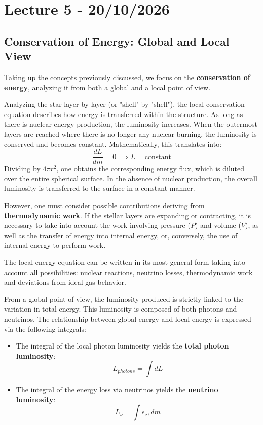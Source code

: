 \chapter{Lecture 5 - 20/10/2026}

\section{Conservation of Energy: Global and Local View}

Taking up the concepts previously discussed, we focus on the \textbf{conservation of energy}, analyzing it from both a global and a local point of view.

Analyzing the star layer by layer (or "shell" by "shell"), the local conservation equation describes how energy is transferred within the structure. As long as there is nuclear energy production, the luminosity increases. When the outermost layers are reached where there is no longer any nuclear burning, the luminosity is conserved and becomes constant. Mathematically, this translates into:
\begin{equation}
\frac{dL}{dm} = 0 \implies L = \text{constant}
\end{equation}
Dividing by $4\pi r^2$, one obtains the corresponding energy flux, which is diluted over the entire spherical surface. In the absence of nuclear production, the overall luminosity is transferred to the surface in a constant manner.

However, one must consider possible contributions deriving from \textbf{thermodynamic work}. If the stellar layers are expanding or contracting, it is necessary to take into account the work involving pressure ($P$) and volume ($V$), as well as the transfer of energy into internal energy, or, conversely, the use of internal energy to perform work.

The local energy equation can be written in its most general form taking into account all possibilities: nuclear reactions, neutrino losses, thermodynamic work and deviations from ideal gas behavior.

From a global point of view, the luminosity produced is strictly linked to the variation in total energy. This luminosity is composed of both photons and neutrinos. The relationship between global energy and local energy is expressed via the following integrals:
\begin{itemize}
\item The integral of the local photon luminosity yields the \textbf{total photon luminosity}:
\begin{equation}
L_{photons} = \int dL
\end{equation}
\item The integral of the energy loss via neutrinos yields the \textbf{neutrino luminosity}:
\begin{equation}
L_{\nu} = \int \epsilon_{\nu} , dm
\end{equation}
\end{itemize}

